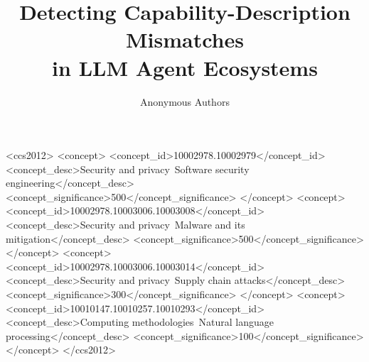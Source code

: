 \documentclass[sigconf,anonymous,review]{acmart}
\theoremstyle{definition}
\begin{document}

\begin{CCSXML}
<ccs2012>
  <concept>
    <concept_id>10002978.10002979</concept_id>
    <concept_desc>Security and privacy~Software security engineering</concept_desc>
    <concept_significance>500</concept_significance>
  </concept>
  <concept>
    <concept_id>10002978.10003006.10003008</concept_id>
    <concept_desc>Security and privacy~Malware and its mitigation</concept_desc>
    <concept_significance>500</concept_significance>
  </concept>
  <concept>
    <concept_id>10002978.10003006.10003014</concept_id>
    <concept_desc>Security and privacy~Supply chain attacks</concept_desc>
    <concept_significance>300</concept_significance>
  </concept>
  <concept>
    <concept_id>10010147.10010257.10010293</concept_id>
    <concept_desc>Computing methodologies~Natural language processing</concept_desc>
    <concept_significance>100</concept_significance>
  </concept>
</ccs2012>
\end{CCSXML}



\title{Detecting Capability-Description Mismatches\\ in LLM Agent Ecosystems}

\author{Anonymous Authors}
\end{document}
